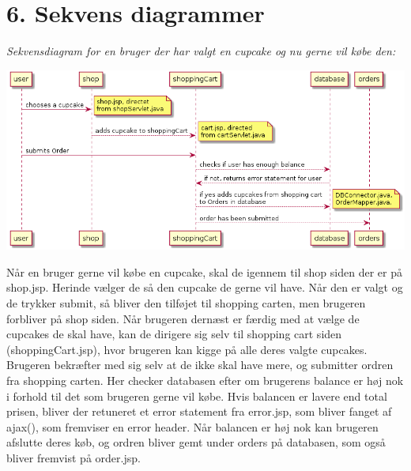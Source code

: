 \documentclass[11pt]{report}
\begin{document}
\chapter*{6. Sekvens diagrammer}
\textit{Sekvensdiagram for en bruger der har valgt en cupcake og nu gerne vil købe den:}
\begin{center}
\includegraphics[width=15cm]{SekvensDiagramCupCake.png}
\end{center}
Når en bruger gerne vil købe en cupcake, skal de igennem til shop siden der er på shop.jsp. Herinde vælger de så den cupcake de gerne vil have. Når den er valgt og de trykker submit, så bliver den tilføjet til shopping carten, men brugeren forbliver på shop siden. Når brugeren dernæst er færdig med at vælge de cupcakes de skal have, kan de dirigere sig selv til shopping cart siden (shoppingCart.jsp), hvor brugeren kan kigge på alle deres valgte cupcakes. Brugeren bekræfter med sig selv at de ikke skal have mere, og submitter ordren fra shopping carten. Her checker databasen efter om brugerens balance er høj nok i forhold til det som brugeren gerne vil købe. Hvis balancen er lavere end total prisen, bliver der retuneret et error statement fra error.jsp, som bliver fanget af ajax(), som fremviser en error header. Når balancen er høj nok kan brugeren afslutte deres køb, og ordren bliver gemt under orders på databasen, som også bliver fremvist på order.jsp.
\end{document}
